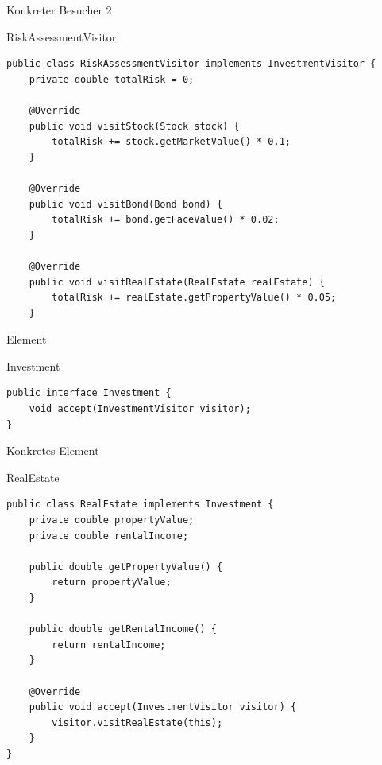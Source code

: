 \begin{frame}[fragile]{Konkreter Besucher 2}
	\begin{exampleblock}{RiskAssessmentVisitor}
 		\begin{lstlisting}
public class RiskAssessmentVisitor implements InvestmentVisitor {
	private double totalRisk = 0;

	@Override
	public void visitStock(Stock stock) {
		totalRisk += stock.getMarketValue() * 0.1;
	}

	@Override
	public void visitBond(Bond bond) {
		totalRisk += bond.getFaceValue() * 0.02;
	}

	@Override
	public void visitRealEstate(RealEstate realEstate) {
		totalRisk += realEstate.getPropertyValue() * 0.05;
	}
 		\end{lstlisting}
 	\end{exampleblock}
\end{frame}

\begin{frame}[fragile]{Element}
	\begin{exampleblock}{Investment}
 		\begin{lstlisting}
public interface Investment {
	void accept(InvestmentVisitor visitor);
}
 		\end{lstlisting}
 	\end{exampleblock}
\end{frame}

\begin{frame}[fragile]{Konkretes Element}
	\begin{exampleblock}{RealEstate}
 		\begin{lstlisting}
public class RealEstate implements Investment {
	private double propertyValue;
	private double rentalIncome;

	public double getPropertyValue() {
		return propertyValue;
	}

	public double getRentalIncome() {
		return rentalIncome;
	}

	@Override
	public void accept(InvestmentVisitor visitor) {
		visitor.visitRealEstate(this);
	}
}
 		\end{lstlisting}
 	\end{exampleblock}
\end{frame}
